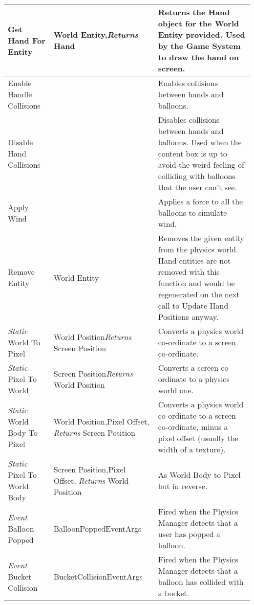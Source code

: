 \begin{longtable}{|p{4.5cm}|p{3.5cm}|p{7.7cm}|}
Get Hand For Entity & World Entity,\newline \emph{Returns} Hand &
Returns the Hand object for the World Entity provided. Used by the Game System
to draw the hand on screen. \\ \hline

Enable Handle Collisions & &
Enables collisions between hands and balloons. \\ \hline

Disable Hand Collisions & &
Disables collisions between hands and balloons. Used when the content box is 
up to avoid the weird feeling of colliding with balloons that the user can't 
see. \\ \hline

Apply Wind & & 
Applies a force to all the balloons to simulate wind. \\ \hline

Remove Entity & World Entity &
Removes the given entity from the physics world. Hand entities are not removed
with this function and would be regenerated on the next call to Update Hand 
Positions anyway. \\ \hline

\emph{Static} World To Pixel & World Position\newline \emph{Returns} Screen Position &
Converts a physics world co-ordinate to a screen co-ordinate.\\ \hline

\emph{Static} Pixel To World & Screen Position\newline \emph{Returns} World Position &
Converts a screen co-ordinate to a physics world one.\\ \hline

\emph{Static} World Body To Pixel & World Position,\newline Pixel Offset,\newline 
\emph{Returns} Screen Position &
Converts a physics world co-ordinate to a screen co-ordinate, minus a pixel 
offset (usually the width of a texture).\\ \hline

\emph{Static} Pixel To World Body & Screen Position,\newline Pixel Offset,\newline
\emph{Returns} World Position & 
As World Body to Pixel but in reverse.\\ \hline

\emph{Event} Balloon Popped & BalloonPopped\-EventArgs &
Fired when the Physics Manager detects that a user has popped a balloon.
\\ \hline

\emph{Event} Bucket Collision & BucketCollision\-EventArgs & 
Fired when the Physics Manager detects that a balloon has collided with a 
bucket.\\ \hline

\end{longtable}

